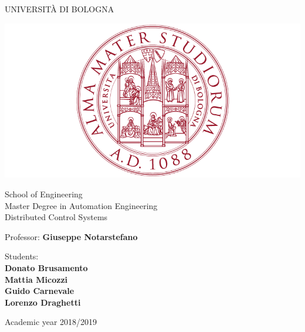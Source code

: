 \documentclass[a4paper,11pt,oneside]{book}
\begin{document}
\pagestyle{myheadings}

\thispagestyle{empty}                                                 
\begin{center}                                                            
    \vspace{5mm}
    {\LARGE UNIVERSIT\`A DI BOLOGNA} \\                       
      \vspace{5mm}
\end{center}
\begin{center}
  \includegraphics[scale=.27]{figs/logo_unibo}
\end{center}
\begin{center}
      \vspace{5mm}
      {\LARGE School of Engineering} \\
        \vspace{3mm}
      {\Large Master Degree in Automation Engineering} \\
      \vspace{20mm}
      {\LARGE Distributed Control Systems} \\
      \vspace{15mm}
\end{center}
\begin{flushleft}                                                                              
     {\large Professor: \textbf{\@ Giuseppe Notarstefano}} \\        
      \vspace{13mm}
\end{flushleft}
\begin{flushright}
      {\large Students:\\
      		\textbf{Donato Brusamento\\
      				Mattia Micozzi\\
      				Guido Carnevale\\
      				Lorenzo Draghetti}}\\
\end{flushright}        %
\begin{center}
\vfill
      {\large Academic year \@2018/2019} \\
\end{center}
\end{document}

